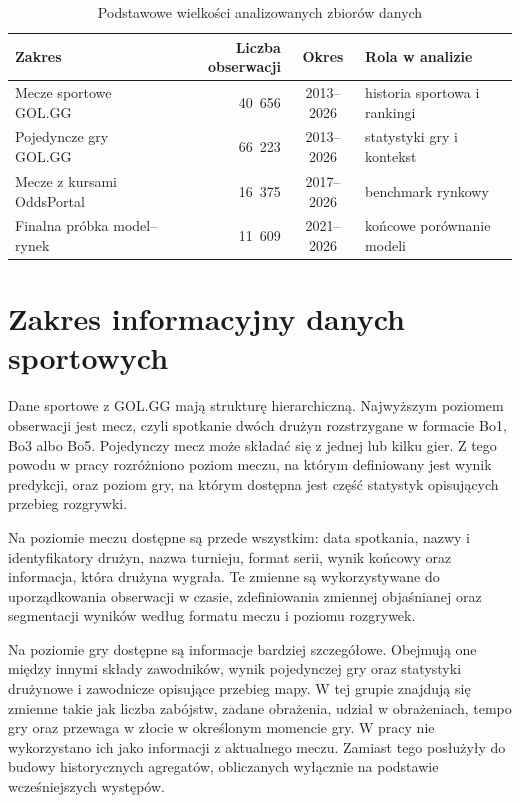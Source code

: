 \begin{table}[H]
    \centering
    \caption{Podstawowe wielkości analizowanych zbiorów danych}
    \label{tab:data_scope_summary}
    \small
    \begin{tabular}{p{5.3cm}r c p{3.2cm}}
        \toprule
        Zakres & Liczba obserwacji & Okres & Rola w analizie \\
        \midrule
        Mecze sportowe GOL.GG & 40~656 & 2013--2026 & historia sportowa i rankingi \\
        Pojedyncze gry GOL.GG & 66~223 & 2013--2026 & statystyki gry i kontekst \\
        Mecze z kursami OddsPortal & 16~375 & 2017--2026 & benchmark rynkowy \\
        Finalna próbka model--rynek & 11~609 & 2021--2026 & końcowe porównanie modeli \\
        \bottomrule
    \end{tabular}
\end{table}

\section{Zakres informacyjny danych sportowych}

Dane sportowe z GOL.GG mają strukturę hierarchiczną. Najwyższym poziomem obserwacji jest mecz, czyli spotkanie dwóch drużyn rozstrzygane w formacie Bo1, Bo3 albo Bo5. Pojedynczy mecz może składać się z jednej lub kilku gier. Z tego powodu w pracy rozróżniono poziom meczu, na którym definiowany jest wynik predykcji, oraz poziom gry, na którym dostępna jest część statystyk opisujących przebieg rozgrywki.

Na poziomie meczu dostępne są przede wszystkim: data spotkania, nazwy i identyfikatory drużyn, nazwa turnieju, format serii, wynik końcowy oraz informacja, która drużyna wygrała. Te zmienne są wykorzystywane do uporządkowania obserwacji w czasie, zdefiniowania zmiennej objaśnianej oraz segmentacji wyników według formatu meczu i poziomu rozgrywek.

Na poziomie gry dostępne są informacje bardziej szczegółowe. Obejmują one między innymi składy zawodników, wynik pojedynczej gry oraz statystyki drużynowe i zawodnicze opisujące przebieg mapy. W tej grupie znajdują się zmienne takie jak liczba zabójstw, zadane obrażenia, udział w obrażeniach, tempo gry oraz przewaga w złocie w określonym momencie gry. W pracy nie wykorzystano ich jako informacji z aktualnego meczu. Zamiast tego posłużyły do budowy historycznych agregatów, obliczanych wyłącznie na podstawie wcześniejszych występów.

